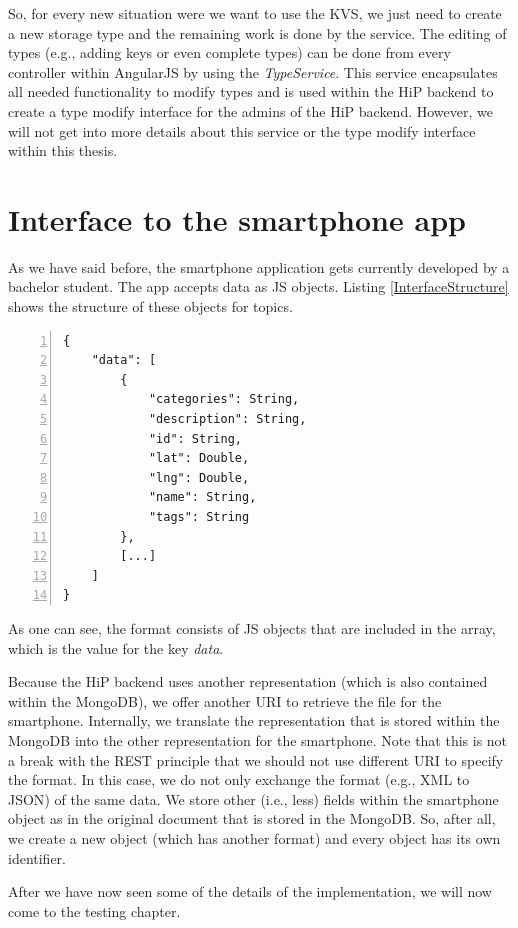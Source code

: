 So, for every new situation were we want to use the \ac{KVS}, we just need to create a new storage type and the remaining work is done by the service. The editing of types (e.g., adding keys or even complete types) can be done from every controller within AngularJS by using the \emph{TypeService}. This service encapsulates all needed functionality to modify types and is used within the \ac{HiP} backend to create a type modify interface for the admins of the \ac{HiP} backend. However, we will not get into more details about this service or the type modify interface within this thesis.

\section{Interface to the smartphone app}
As we have said before, the smartphone application gets currently developed by a bachelor student. The app accepts data as \ac{JS} objects. Listing \ref{InterfaceStructure} shows the structure of these objects for topics. 

\begin{lstlisting}[numbers=left,caption={The format of topic files within the smartphone application.},label=InterfaceStructure,frame=tlbr,breaklines]
{
    "data": [
        {
            "categories": String,
            "description": String,
            "id": String,
            "lat": Double,
            "lng": Double,
            "name": String,
            "tags": String
        },
        [...]
    ]
}
\end{lstlisting}

As one can see, the format consists of \ac{JS} objects that are included in the array, which is the value for the key \emph{data}.  

Because the \ac{HiP} backend uses another representation (which is also contained within the MongoDB), we offer another \ac{URI} to retrieve the file for the smartphone. Internally, we translate the representation that is stored within the MongoDB into the other representation for the smartphone. Note that this is not a break with the \ac{REST} principle that we should not use different \ac{URI} to specify the format. In this case, we do not only exchange the format (e.g., \ac{XML} to \ac{JSON}) of the same data. We store other (i.e., less) fields within the smartphone object as in the original document that is stored in the MongoDB. So, after all, we create a new object (which has another format) and every object has its own identifier. 


After we have now seen some of the details of the implementation, we will now come to the testing chapter. 